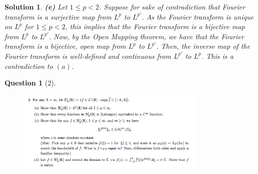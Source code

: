\documentclass{article} %
\theoremstyle{quest}
\newtheorem*{question}{Question}
\newtheorem*{solution}{Solution}
\begin{document}
\begin{solution}
\bigskip


\textbf{(e)} Let $1 \leq p < 2$.
Suppose for sake of contradiction that Fourier transform is a surjective 
map from $L^p$ to $L^{p'}$. As the Fourier 
transform is unique on $L^p$ for $1 \leq p < 2$, this implies that the Fourier transform is a 
bijective map from $L^p$ to  $L^{p'}$. Now, by the Open Mapping theorem, we have that
the Fourier transform is a bijective, open map from $L^p$ to $L^{p'}$. Then,
the inverse map of the Fourier transform is well-defined and continuous from $L^{p'}$
to $L^p$. This is a contradiction to $(a)$.

\end{solution}

\newpage

\begin{question}[2]
\hfill
\begin{figure}[h!]
  \centering
    \includegraphics[width=0.8\textwidth]{HA-5-2.png}
\end{figure}
\end{question}
\end{document}
